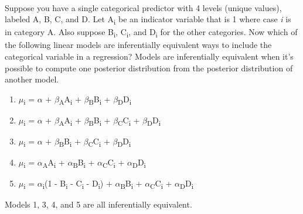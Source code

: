 \documentclass[12pt]{article}\usepackage[]{graphicx}\usepackage[]{color}
\newenvironment{problem}[2][Problem]{\begin{trivlist}
\item[\hskip \labelsep {\bfseries #1}\hskip \labelsep {\bfseries #2.}]}{\end{trivlist}}
\begin{document}
\begin{problem}{5E4}
\text{ }\\
Suppose you have a single categorical predictor with 4 levels (unique values), labeled A, B, C, and D. Let A\textsubscript{i} be an indicator variable that is 1 where case \textit{i} is in category A. Also suppose B\textsubscript{i}, C\textsubscript{i}, and D\textsubscript{i} for the other categories. Now which of the following linear models are inferentially equivalent ways to include the categorical variable in a regression? Models are inferentially equivalent when it's possible to compute one posterior distribution from the posterior distribution of another model.
\begin{enumerate}
	\item $\mu$\textsubscript{i} = $\alpha$ + $\beta$\textsubscript{A}A\textsubscript{i} + $\beta$\textsubscript{B}B\textsubscript{i} + $\beta$\textsubscript{D}D\textsubscript{i}
	\item $\mu$\textsubscript{i} = $\alpha$ + $\beta$\textsubscript{A}A\textsubscript{i} + $\beta$\textsubscript{B}B\textsubscript{i} + $\beta$\textsubscript{C}C\textsubscript{i} + $\beta$\textsubscript{D}D\textsubscript{i}
	\item $\mu$\textsubscript{i} = $\alpha$ + $\beta$\textsubscript{B}B\textsubscript{i} + $\beta$\textsubscript{C}C\textsubscript{i} + $\beta$\textsubscript{D}D\textsubscript{i}
	\item $\mu$\textsubscript{i} = $\alpha$\textsubscript{A}A\textsubscript{i} + $\alpha$\textsubscript{B}B\textsubscript{i} + $\alpha$\textsubscript{C}C\textsubscript{i} + $\alpha$\textsubscript{D}D\textsubscript{i}
	\item $\mu$\textsubscript{i} = $\alpha$\textsubscript{i}(1 - B\textsubscript{i} - C\textsubscript{i} - D\textsubscript{i}) + $\alpha$\textsubscript{B}B\textsubscript{i} + $\alpha$\textsubscript{C}C\textsubscript{i} + $\alpha$\textsubscript{D}D\textsubscript{i}
\end{enumerate}
\end{problem}

Models 1, 3, 4, and 5 are all inferentially equivalent.
\end{document}
